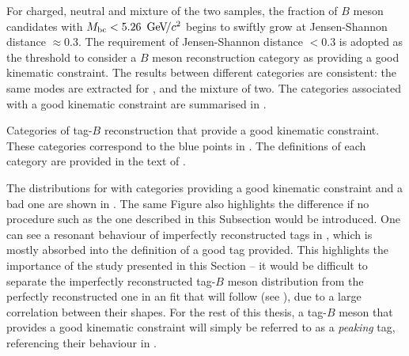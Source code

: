 For charged, neutral and mixture of the two samples, the fraction of $B$ meson candidates with ${M_{\mathrm{bc}}}<5.26~{\mathrm{\,Ge\kern -0.1em V\!/}c^2}$ begins to swiftly grow at Jensen-Shannon distance $\approx0.3$.
The requirement of Jensen-Shannon distance $<0.3$ is adopted as the threshold to consider a $B$ meson reconstruction category as providing a good kinematic constraint.
The results between different categories are consistent: the same modes are extracted for \Bp, \Bz and the mixture of two.
The categories associated with a good kinematic constraint are summarised in .
\begin{table}[htbp!]
    \centering
    \caption{\label{tab:error_codes}Categories of tag-$B$ reconstruction that provide a good kinematic constraint.
    These categories correspond to the blue points in .
    The definitions of each category are provided in the text of .
    }
    
\end{table}


The \Mbc distributions for \BtoXsgamma with categories providing a good kinematic constraint and a bad one are shown in .
The same Figure also highlights the difference if no procedure such as the one described in this Subsection would be introduced.
One can see a resonant behaviour of imperfectly reconstructed tags in , which is mostly absorbed into the definition of a good tag provided.
This highlights the importance of the study presented in this Section -- it would be difficult to separate the imperfectly reconstructed tag-$B$ meson distribution from the perfectly reconstructed one in an \Mbc fit that will follow (see ), due to a large correlation between their shapes.
For the rest of this thesis, a tag-$B$ meson that provides a good kinematic constraint will simply be referred to as a \textit{peaking} tag, referencing their behaviour in \Mbc.

